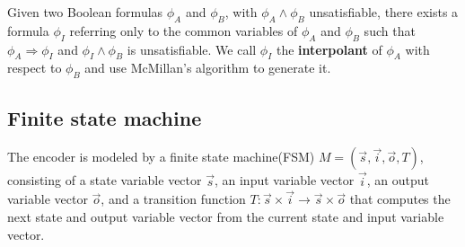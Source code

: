 \documentclass[runningheads,a4paper,orivec]{llncs}
\begin{document}

Given two Boolean formulas $\phi_A$ and $\phi_B$,
with $\phi_A\wedge \phi_B$ unsatisfiable,
there exists a formula $\phi_I$ referring only
to the common variables of $\phi_A$ and $\phi_B$ such that $\phi_A\Rightarrow \phi_I$
and $\phi_I\wedge \phi_B$ is unsatisfiable.
We call $\phi_I$ the \textbf{interpolant} \cite{Craig} of $\phi_A$ with respect to $\phi_B$
and use McMillan's algorithm \cite{interp_McMillan} to generate it.




\subsection{Finite state machine}\label{subsec_fsm}



The encoder is modeled by a finite state machine(FSM) $M=(\vec{s},\vec{i},\vec{o},T)$,
consisting of a state variable vector $\vec{s}$,
an input variable vector $\vec{i}$,
an output variable vector $\vec{o}$,
and a transition function $T: \vec{s}\times \vec{i}\to \vec{s}\times \vec{o}$ 
that computes the next state and output variable vector from the current state and input variable vector.
\end{document}
